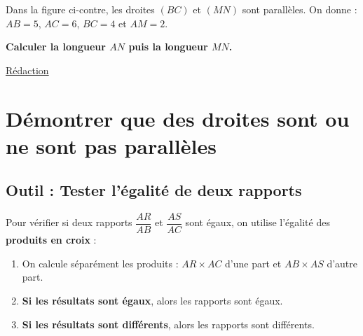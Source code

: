 \documentclass[a4paper]{book}
\begin{document}
    \begin{exemple}
        \begin{minipage}[t]{0.45\textwidth}
            Dans la figure ci-contre, les droites $(BC)$ et $(MN)$ sont parallèles.
            On donne : $AB = 5$, $AC = 6$, $BC = 4$ et $AM = 2$.
            
            \textbf{Calculer la longueur $AN$ puis la longueur $MN$.}
            
        \end{minipage}
        \hfill \vline \hfill
        \begin{minipage}[t]{0.52\textwidth}
            \underline{Rédaction}
        \end{minipage} 
    \end{exemple}


\section{Démontrer que des droites sont ou ne sont pas parallèles}
\subsection{Outil : Tester l'égalité de deux rapports}

    \begin{methode}
        Pour vérifier si deux rapports $\dfrac{AR}{AB}$ et $\dfrac{AS}{AC}$ sont égaux, on utilise l'égalité des \textbf{produits en croix} :
        \begin{enumerate}
            \item On calcule séparément les produits : $AR \times AC$ d'une part et $AB \times AS$ d'autre part.
            \item \textbf{Si les résultats sont égaux}, alors les rapports sont égaux.
            \item \textbf{Si les résultats sont différents}, alors les rapports sont différents.
        \end{enumerate}
    \end{methode}
    
\end{document}
